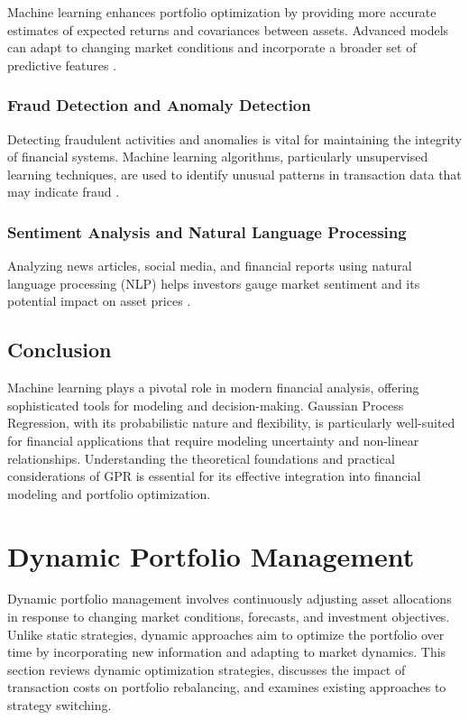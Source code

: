 Machine learning enhances portfolio optimization by providing more accurate estimates of expected returns and covariances between assets. Advanced models can adapt to changing market conditions and incorporate a broader set of predictive features \cite{heaton2017deep}.

\subsubsection{Fraud Detection and Anomaly Detection}

Detecting fraudulent activities and anomalies is vital for maintaining the integrity of financial systems. Machine learning algorithms, particularly unsupervised learning techniques, are used to identify unusual patterns in transaction data that may indicate fraud \cite{phua2010comprehensive}.

\subsubsection{Sentiment Analysis and Natural Language Processing}

Analyzing news articles, social media, and financial reports using natural language processing (NLP) helps investors gauge market sentiment and its potential impact on asset prices \cite{hagenau2013automated}.


\subsection{Conclusion}

Machine learning plays a pivotal role in modern financial analysis, offering sophisticated tools for modeling and decision-making. Gaussian Process Regression, with its probabilistic nature and flexibility, is particularly well-suited for financial applications that require modeling uncertainty and non-linear relationships. Understanding the theoretical foundations and practical considerations of GPR is essential for its effective integration into financial modeling and portfolio optimization.


\section{Dynamic Portfolio Management}

Dynamic portfolio management involves continuously adjusting asset allocations in response to changing market conditions, forecasts, and investment objectives. Unlike static strategies, dynamic approaches aim to optimize the portfolio over time by incorporating new information and adapting to market dynamics. This section reviews dynamic optimization strategies, discusses the impact of transaction costs on portfolio rebalancing, and examines existing approaches to strategy switching.

